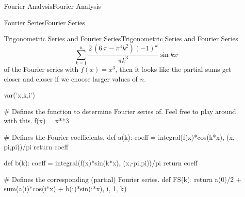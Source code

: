 \documentclass[10pt,]{book}
\numberwithin{equation}{section}
\begin{document}
\begin{chapterptx}{Fourier Analysis}{}{Fourier Analysis}{}{}
\begin{sectionptx}{Fourier Series}{}{Fourier Series}{}{}
\begin{subsectionptx}{Trigonometric Series and Fourier Series}{}{Trigonometric Series and Fourier Series}{}{}
\begin{equation*}
\sum_{k=1}^{n}\frac{2 \, {\left(6 \, \pi - \pi^{3} k^{2}\right)} \left(-1\right)^{k}}{\pi k^{3}}\sin kx
\end{equation*}
of the Fourier series with \(f(x) = x^{3}\), then it looks like the partial sums get closer and closer if we choose larger values of \(n\).%
\begin{sageinput}
var('x,k,i')

# Defines the function to determine Fourier series of. Feel free to play around with this.
f(x) = x**3

# Defines the Fourier coefficients.
def a(k):
coeff = integral(f(x)*cos(k*x), (x,-pi,pi))/pi
return coeff

def b(k):
coeff = integral(f(x)*sin(k*x), (x,-pi,pi))/pi
return coeff

# Defines the corresponding (partial) Fourier series.
def FS(k): 
return a(0)/2 + sum(a(i)*cos(i*x) + b(i)*sin(i*x), i, 1, k)


\end{sageinput}
\end{subsectionptx}
\end{sectionptx}
\end{chapterptx}
\end{document}
